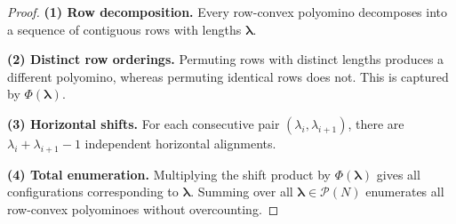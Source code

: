 \documentclass[10pt,a4paper]{amsart}
\begin{document}
\begin{proof}
\textbf{(1) Row decomposition.} Every row-convex polyomino decomposes into 
a sequence of contiguous rows with lengths $\boldsymbol{\lambda}$.

\textbf{(2) Distinct row orderings.} Permuting rows with distinct lengths 
produces a different polyomino, whereas permuting identical rows does not. 
This is captured by $\Phi(\boldsymbol{\lambda})$.

\textbf{(3) Horizontal shifts.} For each consecutive pair 
$(\lambda_i, \lambda_{i+1})$, there are $\lambda_i + \lambda_{i+1} - 1$ 
independent horizontal alignments.

\textbf{(4) Total enumeration.} Multiplying the shift product by 
$\Phi(\boldsymbol{\lambda})$ gives all configurations corresponding to 
$\boldsymbol{\lambda}$. Summing over all $\boldsymbol{\lambda} \in 
\mathcal{P}(N)$ enumerates all row-convex polyominoes without overcounting.
\end{proof}
\end{document}
